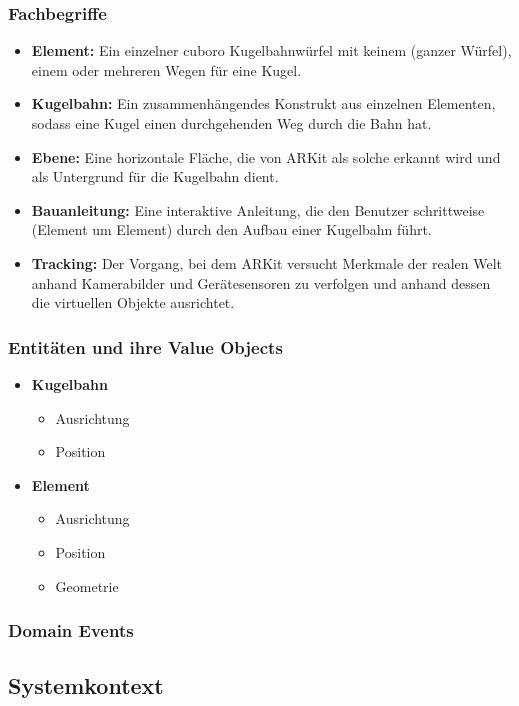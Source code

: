 \subsubsection{Fachbegriffe}
\begin{itemize}
	\item \textbf{Element:} Ein einzelner cuboro Kugelbahnwürfel mit keinem (ganzer Würfel), einem oder mehreren Wegen für eine Kugel.
	\item \textbf{Kugelbahn:} Ein zusammenhängendes Konstrukt aus einzelnen Elementen, sodass eine Kugel einen durchgehenden Weg durch die Bahn hat.
	\item \textbf{Ebene:} Eine horizontale Fläche, die von ARKit als solche erkannt wird und als Untergrund für die Kugelbahn dient.
	\item \textbf{Bauanleitung:} Eine interaktive Anleitung, die den Benutzer schrittweise (Element um Element) durch den Aufbau einer Kugelbahn führt.
	\item \textbf{Tracking:} Der Vorgang, bei dem ARKit versucht Merkmale der realen Welt anhand Kamerabilder und Gerätesensoren zu verfolgen und anhand dessen die virtuellen Objekte ausrichtet.
\end{itemize}

\subsubsection{Entitäten und ihre Value Objects}
\begin{itemize}
	\item \textbf{Kugelbahn}
	\begin{itemize}
		\item Ausrichtung
		\item Position
	\end{itemize}
	\item \textbf{Element}
	\begin{itemize}
		\item Ausrichtung
		\item Position
		\item Geometrie
	\end{itemize}
\end{itemize}

\subsubsection{Domain Events}

\subsection{Systemkontext}

